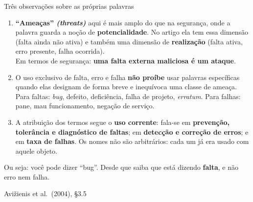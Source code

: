\documentclass{beamer}
\newcommand{\en}[1]{{\color{depCinza}\textit{#1}}}
\newcommand{\sect}[1]{\par\smallskip\hfill{\tiny\color{black!55}Avi\v{z}ienis et al.\ (2004), #1}}
\begin{document}
\begin{frame}{Tr\^es observa\c{c}\~oes sobre as pr\'oprias palavras}
    \footnotesize
    \begin{enumerate}
        \item \textbf{``Amea\c{c}as'' \en{(threats)}} aqui \'e mais amplo do que na seguran\c{c}a, onde a palavra guarda a no\c{c}\~ao de \textbf{potencialidade}. No artigo ela tem essa dimens\~ao (falta ainda n\~ao ativa) e tamb\'em uma dimens\~ao de \textbf{realiza\c{c}\~ao} (falta ativa, erro presente, falha ocorrida). \\
        {\scriptsize Em termos de seguran\c{c}a: \textbf{uma falta externa maliciosa \'e um ataque}.}
        \medskip
        \item O uso exclusivo de falta, erro e falha \textbf{n\~ao pro\'ibe} usar palavras espec\'ificas quando elas designam de forma breve e inequ\'ivoca uma classe de amea\c{c}a. Para faltas: \textit{bug}, defeito, defici\^encia, falha de projeto, \textit{erratum}. Para falhas: pane, mau funcionamento, nega\c{c}\~ao de servi\c{c}o.
        \medskip
        \item A atribui\c{c}\~ao dos termos segue o \textbf{uso corrente}: fala-se em \textbf{preven\c{c}\~ao, toler\^ancia e diagn\'ostico de faltas}; em \textbf{detec\c{c}\~ao e corre\c{c}\~ao de erros}; e em \textbf{taxa de falhas}. Os nomes n\~ao s\~ao arbitr\'arios: cada um j\'a era usado com aquele objeto.
    \end{enumerate}
    \medskip
    \begin{ancora}
        \footnotesize
        Ou seja: voc\^e pode dizer ``bug''. Desde que saiba que est\'a dizendo \textbf{falta}, e n\~ao erro nem falha.
    \end{ancora}
    \sect{\S3.5}
\end{frame}
\end{document}
